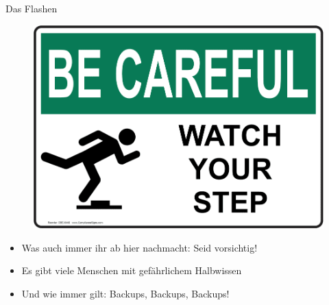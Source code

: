 \begin{frame}{Das Flashen}
	\begin{figure}
		\includegraphics[scale=0.2]{resources/OSHA-Watch-Your-Step-Sign-OBE-6440_1000.jpg}
	\end{figure}
	\begin{itemize}[<+->]
		\item Was auch immer ihr ab hier nachmacht: Seid vorsichtig!
		\item Es gibt viele Menschen mit gefährlichem Halbwissen
		\item Und wie immer gilt: Backups, Backups, Backups!
	\end{itemize}
\end{frame}